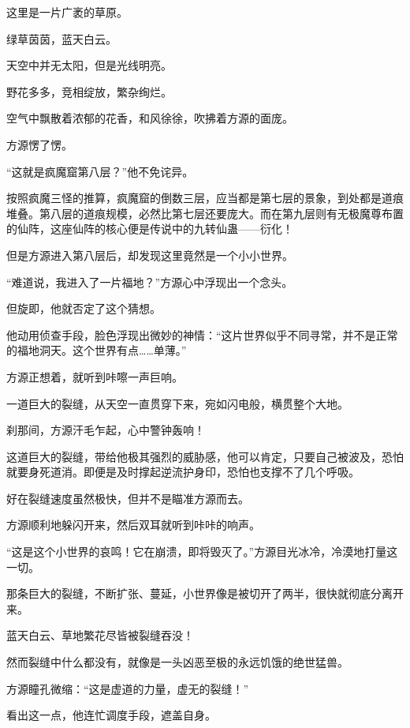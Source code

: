 
\begin{this_body}

这里是一片广袤的草原。

绿草茵茵，蓝天白云。

天空中并无太阳，但是光线明亮。

野花多多，竞相绽放，繁杂绚烂。

空气中飘散着浓郁的花香，和风徐徐，吹拂着方源的面庞。

方源愣了愣。

“这就是疯魔窟第八层？”他不免诧异。

按照疯魔三怪的推算，疯魔窟的倒数三层，应当都是第七层的景象，到处都是道痕堆叠。第八层的道痕规模，必然比第七层还要庞大。而在第九层则有无极魔尊布置的仙阵，这座仙阵的核心便是传说中的九转仙蛊——衍化！

但是方源进入第八层后，却发现这里竟然是一个小小世界。

“难道说，我进入了一片福地？”方源心中浮现出一个念头。

但旋即，他就否定了这个猜想。

他动用侦查手段，脸色浮现出微妙的神情：“这片世界似乎不同寻常，并不是正常的福地洞天。这个世界有点……单薄。”

方源正想着，就听到咔嚓一声巨响。

一道巨大的裂缝，从天空一直贯穿下来，宛如闪电般，横贯整个大地。

刹那间，方源汗毛乍起，心中警钟轰响！

这道巨大的裂缝，带给他极其强烈的威胁感，他可以肯定，只要自己被波及，恐怕就要身死道消。即便是及时撑起逆流护身印，恐怕也支撑不了几个呼吸。

好在裂缝速度虽然极快，但并不是瞄准方源而去。

方源顺利地躲闪开来，然后双耳就听到咔咔的响声。

“这是这个小世界的哀鸣！它在崩溃，即将毁灭了。”方源目光冰冷，冷漠地打量这一切。

那条巨大的裂缝，不断扩张、蔓延，小世界像是被切开了两半，很快就彻底分离开来。

蓝天白云、草地繁花尽皆被裂缝吞没！

然而裂缝中什么都没有，就像是一头凶恶至极的永远饥饿的绝世猛兽。

方源瞳孔微缩：“这是虚道的力量，虚无的裂缝！”

看出这一点，他连忙调度手段，遮盖自身。


\end{this_body}
